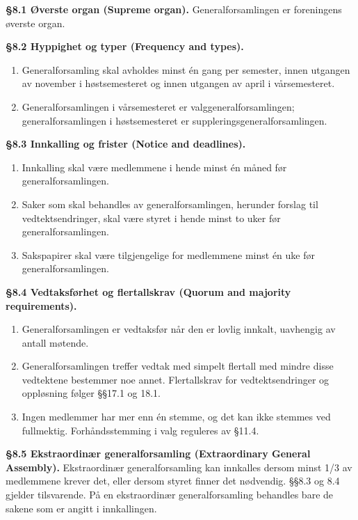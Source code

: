 \documentclass{../../../Common/Latex/Templates/rapport}
\begin{document}
\label{bylaw:8}
\textbf{\S 8.1 Øverste organ (Supreme organ).}\label{bylaw:8.1} Generalforsamlingen er foreningens øverste organ.

\textbf{\S 8.2 Hyppighet og typer (Frequency and types).}\label{bylaw:8.2}
\begin{enumerate}
  \item Generalforsamling skal avholdes minst én gang per semester, innen utgangen av november i høstsemesteret og innen utgangen av april i vårsemesteret.
  \item Generalforsamlingen i vårsemesteret er valggeneralforsamlingen; generalforsamlingen i høstsemesteret er suppleringsgeneralforsamlingen.
\end{enumerate}

\textbf{\S 8.3 Innkalling og frister (Notice and deadlines).}\label{bylaw:8.3}
\begin{enumerate}
  \item Innkalling skal være medlemmene i hende minst én måned før generalforsamlingen.
  \item Saker som skal behandles av generalforsamlingen, herunder forslag til vedtektsendringer, skal være styret i hende minst to uker før generalforsamlingen.
  \item Sakspapirer skal være tilgjengelige for medlemmene minst én uke før generalforsamlingen.
\end{enumerate}

\textbf{\S 8.4 Vedtaksførhet og flertallskrav (Quorum and majority requirements).}\label{bylaw:8.4}
\begin{enumerate}
  \item Generalforsamlingen er vedtaksfør når den er lovlig innkalt, uavhengig av antall møtende.
  \item Generalforsamlingen treffer vedtak med simpelt flertall med mindre disse vedtektene bestemmer noe annet. Flertallskrav for vedtektsendringer og oppløsning følger \S\S17.1 og 18.1.
  \item Ingen medlemmer har mer enn én stemme, og det kan ikke stemmes ved fullmektig. Forhåndsstemming i valg reguleres av \S11.4.
\end{enumerate}

\textbf{\S 8.5 Ekstraordinær generalforsamling (Extraordinary General Assembly).}\label{bylaw:8.5} Ekstraordinær generalforsamling kan innkalles dersom minst 1/3 av medlemmene krever det, eller dersom styret finner det nødvendig. \S\S8.3 og 8.4 gjelder tilsvarende. På en ekstraordinær generalforsamling behandles bare de sakene som er angitt i innkallingen.
\end{document}
